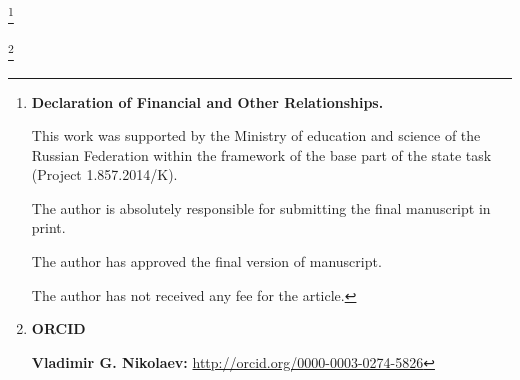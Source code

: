 


\RuDate



\newpage





\makeentitle



\thanks{{\bf Declaration of Financial and Other Relationships.}

This work was supported by the Ministry of education and science of the Russian Federation within the framework of the base part of the state task  (Project 1.857.2014/K).

The author is absolutely responsible for submitting the final manuscript in print.

The author has approved the final version of manuscript.

The author has not received any fee for the article.

}













\thanks{{\bf ORCID}



{\bf  Vladimir G. Nikolaev:} \url{http://orcid.org/0000-0003-0274-5826}

}





\pagebreak



\EngRef





